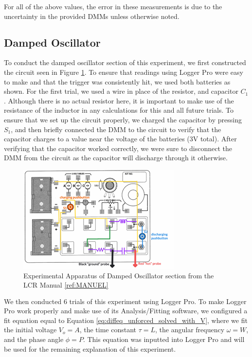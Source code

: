 \documentclass[12pt]{article}
\begin{document}
For all of the above values, the error in these measurements is due to the uncertainty in the provided DMMs unless otherwise noted.

\subsection{Damped Oscillator}
To conduct the damped oscillator section of this experiment, we first constructed the circuit seen in Figure \ref{fig:LCR_Apparatus_1}. To ensure that readings using Logger Pro were easy to make and that the trigger was consistently hit, we used both batteries as shown. For the first trial, we used a wire in place of the resistor, and capacitor $C_1$. Although there is no actual resistor here, it is important to make use of the resistance of the inductor in any calculations for this and all future trials. To ensure that we set up the circuit properly, we charged the capacitor by pressing $S_1$, and then briefly connected the DMM to the circuit to verify that the capacitor charges to a value near the voltage of the batteries (3V total). After verifying that the capacitor worked correctly, we were sure to disconnect the DMM from the circuit as the capacitor will discharge through it otherwise.

\begin{figure}
    \centering
    \includegraphics[width=\linewidth]{figures/images/LCR_Apparatus_1.png}
    \caption{Experimental Apparatus of Damped Oscillator section from the LCR Manual \ref{ref:MANUEL}}
    \label{fig:LCR_Apparatus_1}
\end{figure}

We then conducted 6 trials of this experiment using Logger Pro. To make Logger Pro work properly and make use of its Analysis/Fitting software, we configured a fit equation equal to Equation \ref{eq:diffeq_unforced_solved_with_V}, where we fit the initial voltage $V_o=A$, the time constant $\tau=L$, the angular frequency $\omega=W$, and the phase angle $\phi=P$. This equation was inputted into Logger Pro and will be used for the remaining explanation of this experiment.
\end{document}
